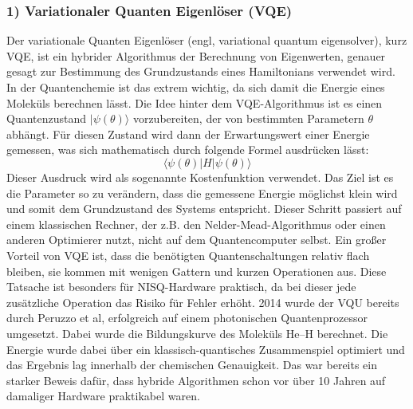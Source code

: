\subsubsection*{1) Variationaler Quanten Eigenlöser (VQE)}
Der variationale Quanten Eigenlöser (engl, variational quantum eigensolver), kurz VQE, ist ein hybrider Algorithmus der Berechnung von Eigenwerten, genauer gesagt zur Bestimmung des Grundzustands eines Hamiltonians verwendet wird. In der Quantenchemie ist das extrem wichtig, da sich damit die Energie eines Moleküls berechnen lässt. Die Idee hinter dem VQE-Algorithmus ist es einen Quantenzustand $|\psi(\theta)\rangle$ vorzubereiten, der von bestimmten Parametern $\theta$ abhängt. Für diesen Zustand wird dann der Erwartungswert einer Energie gemessen, was sich mathematisch durch folgende Formel ausdrücken lässt:
$$
\langle\psi(\theta)|H|\psi(\theta)\rangle
$$
Dieser Ausdruck wird als sogenannte Kostenfunktion verwendet. Das Ziel ist es die Parameter \θ so zu verändern, dass die gemessene Energie möglichst klein wird und somit dem Grundzustand des Systems entspricht. Dieser Schritt passiert auf einem klassischen Rechner, der z.B. den Nelder-Mead-Algorithmus oder einen anderen Optimierer nutzt, nicht auf dem Quantencomputer selbst. 
Ein großer Vorteil von VQE ist, dass die benötigten Quantenschaltungen relativ flach bleiben, sie kommen mit wenigen Gattern und kurzen Operationen aus. Diese Tatsache ist besonders für NISQ-Hardware praktisch, da bei dieser jede zusätzliche Operation das Risiko für Fehler erhöht. 
2014 wurde der VQU bereits durch Peruzzo et al, erfolgreich auf einem photonischen Quantenprozessor umgesetzt. Dabei wurde die Bildungskurve des Moleküls He–H\⁺ berechnet. Die Energie wurde dabei über ein klassisch-quantisches Zusammenspiel optimiert und das Ergebnis lag innerhalb der chemischen Genauigkeit. Das war bereits ein starker Beweis dafür, dass hybride Algorithmen schon vor über 10 Jahren auf damaliger Hardware praktikabel waren. 


